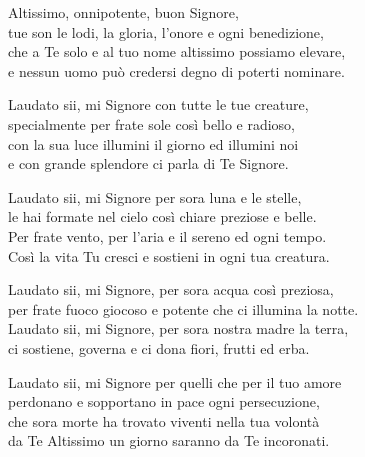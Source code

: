 
\strofa Altissimo, onnipotente, buon Signore,\\
tue son le lodi, la gloria, l'onore e ogni benedizione,\\
che a Te solo e al tuo nome altissimo possiamo elevare,\\
e nessun uomo può credersi degno di poterti nominare.

\spazio

\strofa Laudato sii, mi Signore con tutte le tue creature,\\
specialmente per frate sole così bello e radioso,\\
con la sua luce illumini il giorno ed illumini noi\\
e con grande splendore ci parla di Te Signore.

\spazio

 

\spazio

\strofa Laudato sii, mi Signore per sora luna e le stelle,\\
le hai formate nel cielo così chiare preziose e belle.\\
Per frate vento, per l'aria e il sereno ed ogni tempo.\\
Così la vita Tu cresci e sostieni in ogni tua creatura.

\spazio

\strofa Laudato sii, mi Signore, per sora acqua così preziosa,\\
per frate fuoco giocoso e potente che ci illumina la notte.\\
Laudato sii, mi Signore, per sora nostra madre la terra,\\
ci sostiene, governa e ci dona fiori, frutti ed erba.

\spazio


\spazio

\strofa Laudato sii, mi Signore per quelli che per il tuo amore\\
perdonano e sopportano in pace ogni persecuzione,\\
che sora morte ha trovato viventi nella tua volontà\\
da Te Altissimo un giorno saranno da Te incoronati.

\spazio

